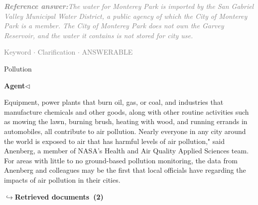 \documentclass[a4paper,11pt]{article}
\begin{document}
\begin{refanswerenv}
{\footnotesize\textit{\textcolor{gray}{\textbf{Reference answer:}\enspace The water for Monterey Park is imported by the San Gabriel Valley Municipal Water District, a public agency of which the City of Monterey Park is a member. The City of Monterey Park does not own the Garvey Reservoir, and the water it contains is not stored for city use.}}}
\end{refanswerenv}
\vspace{0.5em}
\hfill{\tiny\textcolor{gray}{Keyword $\cdot$ Clarification $\cdot$ ANSWERABLE}}
\begin{userbubble}
Pollution
\end{userbubble}
\noindent\hfill{\small\textcolor{agentcolor}{\textbf{Agent\enspace$\triangleleft$}}}
\begin{agentbubble}
Equipment, power plants that burn oil, gas, or coal, and industries that manufacture chemicals and other goods, along with other routine activities such as mowing the lawn, burning brush, heating with wood, and running errands in automobiles, all contribute to air pollution. Nearly everyone in any city around the world is exposed to air that has harmful levels of air pollution," said Anenberg, a member of NASA’s Health and Air Quality Applied Sciences team. For areas with little to no ground-based pollution monitoring, the data from Anenberg and colleagues may be the first that local officials have regarding the impacts of air pollution in their cities.
\end{agentbubble}
\noindent\hfill{\footnotesize\textcolor{doccolor}{\textbf{$\hookrightarrow$\enspace Retrieved documents~(2)}}}
\end{document}
